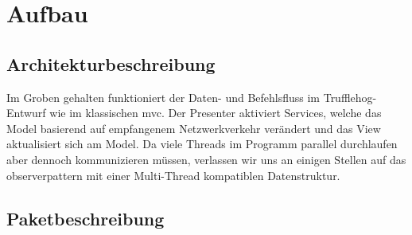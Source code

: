 \chapter{Aufbau \programname}

\section{Architekturbeschreibung}
Im Groben gehalten funktioniert der Daten- und Befehlsfluss im Trufflehog-Entwurf
wie im klassischen \gls{mvc}. Der Presenter aktiviert Services, welche das Model basierend
auf empfangenem Netzwerkverkehr verändert und das View aktualisiert sich am Model.
Da viele Threads im Programm parallel durchlaufen aber dennoch kommunizieren müssen,
verlassen wir uns an einigen Stellen auf das \gls{observerpattern} mit einer
Multi-Thread kompatiblen Datenstruktur.\newline
\newline

\section{Paketbeschreibung}

